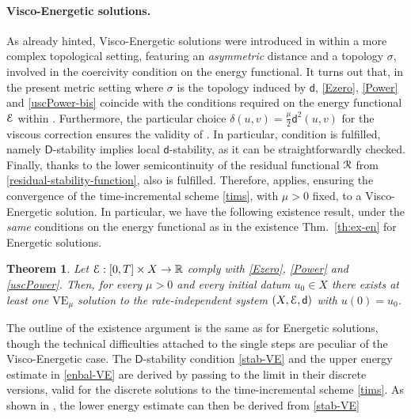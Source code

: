 \documentclass[a4paper,10pt,reqno]{amsart} %
\newcommand{\R}{\mathbb{R}}
\newtheorem{theorem}{Theorem}[section]
\numberwithin{equation}{section}
\newcommand{\Xs}{X}
\newcommand{\mdn}{\mathsf{d}}
\newcommand{\cmdn}{\mathsf{D}}
\newcommand{\corr}[2]{\delta(#1,#2)}
\newcommand{\RIS}{(\Xs,\calE,\mdn)}
\newcommand{\VEa}[1]{\mathrm{VE}_{#1}}
\newcommand{\RRR}{\color{red}}
\newcommand{\EEE}{\color{black}}
\begin{document}
\paragraph{\bf Visco-Energetic solutions.} 
As already hinted, Visco-Energetic solutions were introduced
in \cite{SavMin16} within a more complex topological setting, featuring an \emph{asymmetric} distance and a topology $\sigma$, involved in the coercivity condition on the energy functional.
 It turns out that, in the present metric setting where $\sigma$ is the topology induced by $\mdn$,
\eqref{Ezero}, \eqref{Power} and  \eqref{uscPower-bis} coincide with the conditions required on the energy functional ${\mathcal E}$ within  \cite[Assumption \textbf{$<A>$}, Sec.\ 2.2]{SavMin16}.  Furthermore, the particular choice $\corr uv = \tfrac \mu2 \mdn^2(u,v)$ for the viscous correction ensures the validity of \cite[Assumption \textbf{$<B>$}, Sec.\ 3.1]{SavMin16}.
In particular, condition 
\cite[\textbf{$<B.3>$}, Sec.\ 3.1]{SavMin16}
is fulfilled, namely $\cmdn$-stability implies local $\mdn$-stability, as it can be straightforwardly checked. 
Finally, thanks to the lower semicontinuity of the residual functional ${\mathcal R}$ from \eqref{residual-stability-function}, also  \cite[Assumption \textbf{$<C>$}, Sec.\ 3.3]{SavMin16} is fulfilled. Therefore, \cite[Thm.\ 3.9]{SavMin16} applies, ensuring the convergence of the 
time-incremental scheme \eqref{tims}, with $\mu>0$ fixed,  to a Visco-Energetic solution. In particular, we have the following existence result, under the \emph{same} conditions on the energy functional as in  the existence Thm.\ \ref{th:ex-en} for Energetic solutions. 
\begin{theorem}
\label{th:ex-ve}
  Let $\calE: [0,T]\times \Xs \to \R$ comply with  \eqref{Ezero}, \eqref{Power} and \eqref{uscPower}. Then, for every
   $\mu>0$ and every 
    initial datum $u_0 \in \Xs$ there exists at least one   $\VEa{\mu}$ solution  to the rate-independent system $\RIS$ with $u(0)=u_0$.
\end{theorem}
The  outline of the existence argument is the same as for   Energetic solutions, though the technical difficulties attached to the single steps are peculiar of the Visco-Energetic case. The $\cmdn$-stability condition \eqref{stab-VE} and the upper energy estimate in \eqref{enbal-VE} are derived by passing to the limit in their discrete versions, valid for the discrete solutions to the time-incremental scheme \eqref{tims}. As shown in \cite[Thm.\ 6.5]{SavMin16}, the lower energy estimate  can then be derived from   \eqref{stab-VE} 
\end{document}
